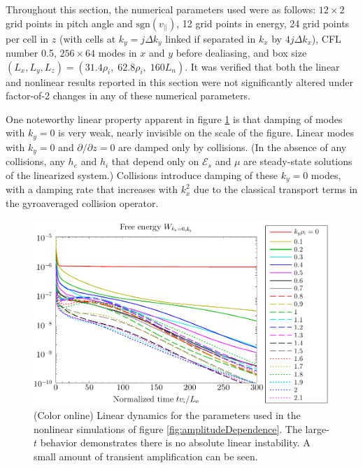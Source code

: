\documentclass[12pt,superscriptaddress]{revtex4}
\newcommand{\energy}{\mathcal{E}}
\newcommand{\sgn}{\mathrm{sgn}}
\begin{document}
Throughout this section, the numerical parameters used were as follows: $12 \times 2$ grid points in pitch angle and $\sgn(v_{||})$, 12 grid points in energy, 24 grid points per cell in $z$ (with cells at $k_y=j \Delta k_y$ linked if separated in $k_x$ by $4 j \Delta k_x$), CFL number 0.5, $256 \times 64$ modes in $x$ and $y$ before dealiasing, and box size $(L_x, L_y, L_z) = (31.4 \rho_i, \; 62.8 \rho_i, \; 160 L_n)$.  It was verified that both the linear and nonlinear results reported in this section were not significantly altered under factor-of-2 changes in any of these numerical parameters.

One noteworthy linear property apparent in figure \ref{fig:linearBox}
is that damping of modes with $k_y=0$ is very weak,
nearly invisible on the scale of the figure.
Linear modes with $k_y=0$ and $\partial/\partial z=0$ are damped only by collisions.
(In the absence of any collisions, any $h_e$ and $h_i$ that depend only on $\energy_s$ and $\mu$ are steady-state solutions of the linearized system.)
Collisions introduce damping of these $k_y=0$ modes, with a damping rate that increases with $k_x^2$ due to the classical transport terms in the gyroaveraged collision operator.


\begin{figure}[h!]
\includegraphics[width=6.5in]{m20141126_01_plotWVsTimeForPaper_linearBox.pdf}
\caption{(Color online)
Linear dynamics for the parameters used in the
nonlinear simulations of figure \ref{fig:amplitudeDependence}.
The large-$t$ behavior demonstrates there is no absolute linear instability.
A small amount of transient amplification can be seen.
\label{fig:linearBox}}
\end{figure}
\end{document}
